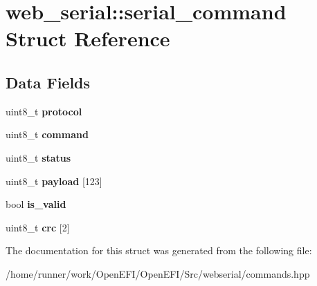 \hypertarget{structweb__serial_1_1serial__command}{}\section{web\+\_\+serial\+:\+:serial\+\_\+command Struct Reference}
\label{structweb__serial_1_1serial__command}
\subsection*{Data Fields}
\begin{DoxyCompactItemize}
\item 
\mbox{\label{structweb__serial_1_1serial__command_ac4416bc0d0cc1d325beeb0729ab019f6}} 
uint8\+\_\+t {\bfseries protocol}
\item 
\mbox{\label{structweb__serial_1_1serial__command_aea857e9be9c14bc6decaeff66e94cd63}} 
uint8\+\_\+t {\bfseries command}
\item 
\mbox{\label{structweb__serial_1_1serial__command_aa3f49ca13d7cf0154d97be4313161696}} 
uint8\+\_\+t {\bfseries status}
\item 
\mbox{\label{structweb__serial_1_1serial__command_ad19f09253d9c44ebeec74da88137496d}} 
uint8\+\_\+t {\bfseries payload} \mbox{[}123\mbox{]}
\item 
\mbox{\label{structweb__serial_1_1serial__command_ae120fa7eab0b26fdeb0ffc8d9d7c85d3}} 
bool {\bfseries is\+\_\+valid}
\item 
\mbox{\label{structweb__serial_1_1serial__command_a4230269eee1bba2b5637a25efb253aa1}} 
uint8\+\_\+t {\bfseries crc} \mbox{[}2\mbox{]}
\end{DoxyCompactItemize}


The documentation for this struct was generated from the following file\+:\begin{DoxyCompactItemize}
\item 
/home/runner/work/\+Open\+E\+F\+I/\+Open\+E\+F\+I/\+Src/webserial/commands.\+hpp\end{DoxyCompactItemize}
